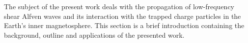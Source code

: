 The subject of the present work deals with the propagation of low-frequency shear
Alfven waves and its interaction with the trapped charge particles in the Earth’s inner
magnetosphere. This section is a brief introduction containing the background, outline and
applications of the presented work.
